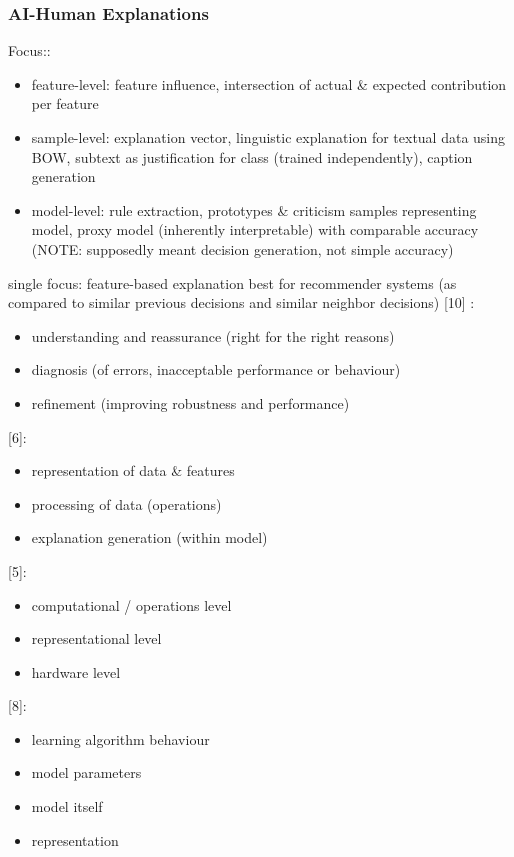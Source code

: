 \subsubsection{AI-Human Explanations}
Focus:\newline
[10]:
\begin{itemize}
	\item feature-level: feature influence, intersection of actual \& expected contribution per feature
	\item sample-level: explanation vector, linguistic explanation for textual data using BOW, subtext as justification for class (trained independently), caption generation 
	\item model-level: rule extraction, prototypes \& criticism samples representing model, proxy model (inherently interpretable) with comparable accuracy (NOTE: supposedly meant decision generation, not simple accuracy)
\end{itemize}
single focus: feature-based explanation best for recommender systems (as compared to similar previous decisions and similar neighbor decisions) [10] \newline
[4]:
\begin{itemize}
	\item understanding and reassurance (right for the right reasons)
	\item diagnosis (of errors, inacceptable performance or behaviour)
	\item refinement (improving robustness and performance)
\end{itemize}
[6]:
\begin{itemize}
	\item representation of data \& features
	\item processing of data (operations)
	\item explanation generation (within model)
\end{itemize}
[5]:
\begin{itemize}
	\item computational / operations level
	\item representational level
	\item hardware level
\end{itemize}
[8]:
\begin{itemize}
	\item learning algorithm behaviour
	\item model parameters
	\item model itself
	\item representation
\end{itemize}
